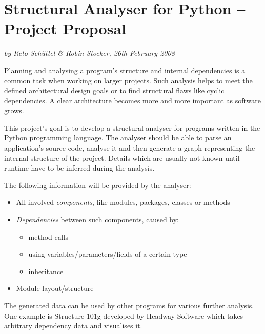 \documentclass[12pt,halfparskip]{scrartcl}
\begin{document}
\pagestyle{plain}

\section*{Structural Analyser for Python – Project Proposal}
\vspace{-0.5cm}

\emph{by Reto Schüttel \& Robin Stocker, 26th February 2008}

\vspace{0.2cm}

Planning and analysing a program's structure and internal dependencies is a common task when working on larger projects. Such analysis helps to meet the defined architectural design goals or to find structural flaws like cyclic dependencies. A clear architecture becomes more and more important as software grows.

This project's goal is to develop a structural analyser for programs written in the Python programming language. The analyser should be able to parse an application's source code, analyse it and then generate a graph representing the internal structure of the project. Details which are usually not known until runtime have to be inferred during the analysis.

The following information will be provided by the analyser: 
\begin{itemize}
	\item All involved \emph{components}, like modules, packages, classes or methods
	\item \emph{Dependencies} between such components, caused by:
	\begin{itemize}
		\item method calls
		\item using variables/parameters/fields of a certain type
		\item inheritance
	\end{itemize}
	\item Module layout/structure
\end{itemize}

The generated data can be used by other programs for various further analysis. One example is Structure 101g developed by Headway Software which takes arbitrary dependency data and visualises it. 

\vspace{-0.1cm}
\end{document}
